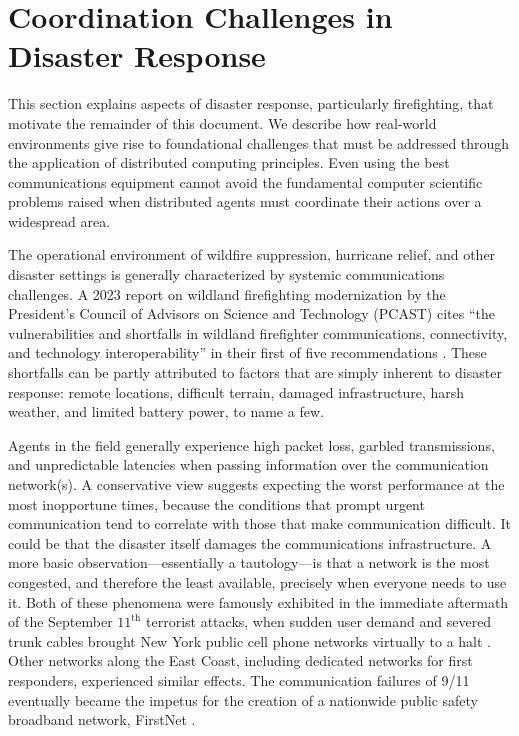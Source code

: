 \documentclass[]             %
{NASA}                       %
\theoremstyle{definition}
\begin{document}
\section{Coordination Challenges in Disaster Response}
\label{sec:disaster-response}
This section explains aspects of disaster response, particularly
firefighting, that motivate the remainder of this document. We
describe how real-world environments give rise to foundational
challenges that must be addressed through the application of
distributed computing principles. Even using the best communications
equipment cannot avoid the fundamental computer scientific problems
raised when distributed agents must coordinate their actions over a
widespread area.

The operational environment of wildfire suppression, hurricane relief,
and other disaster settings is generally characterized by systemic
communications challenges. A 2023 report on wildland firefighting
modernization by the President’s Council of Advisors on Science and
Technology (PCAST) cites ``the vulnerabilities and shortfalls in
wildland firefighter communications, connectivity, and technology
interoperability'' in their first of five recommendations
\cite{pcast2023}. These shortfalls can be partly attributed to factors
that are simply inherent to disaster response: remote locations,
difficult terrain, damaged infrastructure, harsh weather, and limited
battery power, to name a few.

Agents in the field generally experience high packet loss, garbled
transmissions, and unpredictable latencies when passing information
over the communication network(s). A conservative view suggests
expecting the worst performance at the most inopportune times, because
the conditions that prompt urgent communication tend to correlate with
those that make communication difficult. It could be that the disaster
itself damages the communications infrastructure. A more basic
observation---essentially a tautology---is that a network is the most
congested, and therefore the least available, precisely when everyone
needs to use it. Both of these phenomena were famously exhibited in
the immediate aftermath of the September $11^\textrm{th}$ terrorist
attacks, when sudden user demand and severed trunk cables brought New
York public cell phone networks virtually to a halt
\cite{2011:Reardon}. Other networks along the East Coast, including
dedicated networks for first responders, experienced similar
effects. The communication failures of 9/11 eventually became the
impetus for the creation of a nationwide public safety broadband
network, FirstNet \cite{2021:firstnet, 2021:firstnet2}.
\end{document}
